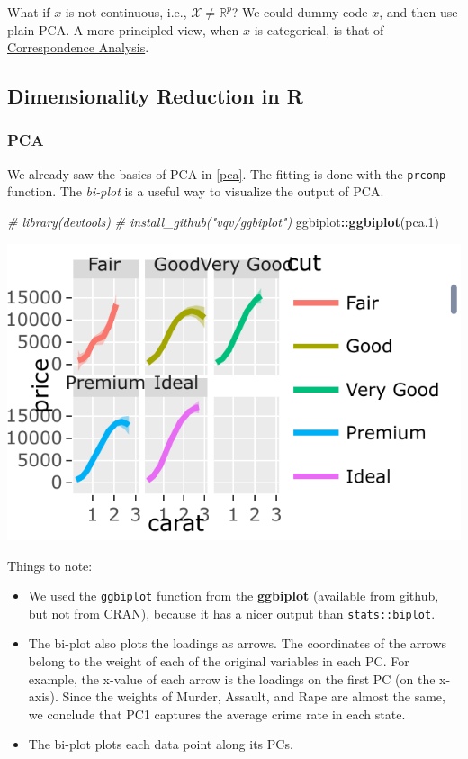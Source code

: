 \documentclass[]{book}
\newenvironment{Shaded}{\begin{snugshade}}{\end{snugshade}}
\newcommand{\KeywordTok}[1]{\textcolor[rgb]{0.13,0.29,0.53}{\textbf{#1}}}
\newcommand{\DecValTok}[1]{\textcolor[rgb]{0.00,0.00,0.81}{#1}}
\newcommand{\CommentTok}[1]{\textcolor[rgb]{0.56,0.35,0.01}{\textit{#1}}}
\newcommand{\OperatorTok}[1]{\textcolor[rgb]{0.81,0.36,0.00}{\textbf{#1}}}
\newcommand{\NormalTok}[1]{#1}
\providecommand{\tightlist}{%
  \setlength{\itemsep}{0pt}\setlength{\parskip}{0pt}}
\theoremstyle{definition}
\theoremstyle{definition}
\theoremstyle{definition}
\theoremstyle{remark}
\begin{document}
What if \(x\) is not continuous, i.e., \(\mathcal{X}\neq \mathbb{R}^p\)?
We could dummy-code \(x\), and then use plain PCA. A more principled
view, when \(x\) is categorical, is that of
\href{https://en.wikipedia.org/wiki/Correspondence_analysis}{Correspondence
Analysis}.

\subsection{Dimensionality Reduction in
R}\label{dimensionality-reduction-in-r}

\subsubsection{PCA}\label{pca-in-r}

We already saw the basics of PCA in \ref{pca}. The fitting is done with
the \texttt{prcomp} function. The \emph{bi-plot} is a useful way to
visualize the output of PCA.

\begin{Shaded}
\begin{Highlighting}[]
\CommentTok{# library(devtools)}
\CommentTok{# install_github("vqv/ggbiplot")}
\NormalTok{ggbiplot}\OperatorTok{::}\KeywordTok{ggbiplot}\NormalTok{(pca.}\DecValTok{1}\NormalTok{) }
\end{Highlighting}
\end{Shaded}

\includegraphics[width=0.5\linewidth]{Rcourse_files/figure-latex/unnamed-chunk-252-1}

Things to note:

\begin{itemize}
\tightlist
\item
  We used the \texttt{ggbiplot} function from the \textbf{ggbiplot}
  (available from github, but not from CRAN), because it has a nicer
  output than \texttt{stats::biplot}.
\item
  The bi-plot also plots the loadings as arrows. The coordinates of the
  arrows belong to the weight of each of the original variables in each
  PC. For example, the x-value of each arrow is the loadings on the
  first PC (on the x-axis). Since the weights of Murder, Assault, and
  Rape are almost the same, we conclude that PC1 captures the average
  crime rate in each state.
\item
  The bi-plot plots each data point along its PCs.
\end{itemize}
\end{document}
